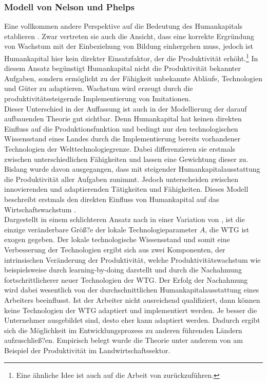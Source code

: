 \subsubsection*{Modell von Nelson und Phelps}
Eine vollkommen andere Perspektive auf die Bedeutung des Humankapitals etablieren \cite{Nelson.1966}. Zwar vertreten sie auch die Ansicht, dass eine korrekte Ergründung von Wachstum mit der Einbeziehung von Bildung einhergehen muss, jedoch ist Humankapital  hier kein direkter Einsatzfaktor, der die Produktivität erhöht.\footnote{Eine ähnliche Idee ist auch auf die Arbeit von \cite{Schultz.1964,Schultz.1975} zurückzuführen.} In diesem Ansatz begünstigt Humankapital nicht die Produktivität bekannter Aufgaben, sondern ermöglicht zu der Fähigkeit unbekannte Abläufe, Technologien und Güter zu adaptieren. Wachstum wird erzeugt durch die produktivitätssteigernde Implementierung von Imitationen. \\
%
Dieser Unterschied in der Auffassung ist auch in der Modellierung der darauf aufbauenden Theorie gut sichtbar. Denn Humankapital hat keinen direkten Einfluss auf die Produktionsfunktion und bedingt nur den technologischen Wissensstand eines Landes durch die Implementierung bereits vorhandener Technologien der Welttechnologiegrenze. Dabei differenzieren sie erstmals zwischen unterschiedlichen Fähigkeiten und lassen eine Gewichtung dieser zu. Bislang wurde davon ausgegangen, dass mit steigender Humankapitalausstattung die Produktivität aller Aufgaben zunimmt. Jedoch unterscheiden \cite{Nelson.1966} zwischen innovierenden und adaptierenden Tätigkeiten und Fähigkeiten. 
Dieses Modell beschreibt erstmals den direkten Einfluss von Humankapital auf das Wirtschaftswachstum \cite{Nelson.1966}.\\
%
Dargestellt in einem schlichteren Ansatz nach \cite{Nelson.1966} in einer Variation von \cite[Kapitel 10]{Acemoglu.2009}, ist die einzige veränderbare Größ?e der lokale Technologieparameter $A$, die WTG ist exogen gegeben. Der lokale technologische Wissensstand und somit eine Verbesserung der Technologien ergibt sich aus zwei Komponenten, der intrinsischen Veränderung der Produktivität, welche Produktivitätswachstum wie beispielsweise durch learning-by-doing darstellt und durch die Nachahmung fortschrittlicherer neuer Technologien der WTG. Der Erfolg der Nachahmung wird dabei wesentlich von der durchschnittlichen Humankapitalausstattung eines Arbeiters beeinflusst. Ist der Arbeiter nicht ausreichend qualifiziert, dann können keine Technologien der WTG adaptiert und implementiert werden. Je besser die Unternehmer ausgebildet sind, desto eher kann adaptiert werden. Dadurch ergibt sich die Möglichkeit im Entwicklungsprozess zu anderen führenden Ländern aufzuschließ?en. Empirisch belegt wurde die Theorie unter anderem von \cite{Foster.1995} am Beispiel der Produktivität im Landwirtschaftssektor.
%
